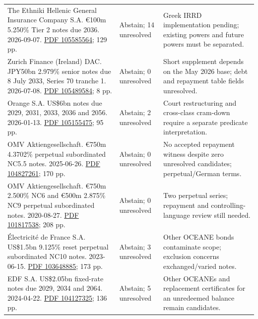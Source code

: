 \documentclass[12pt,a4paper,oneside,openany]{book}
\begin{document}
{\begin{longtable}{P{0.44\textwidth}P{0.12\textwidth}P{0.34\textwidth}}
The Ethniki Hellenic General Insurance Company S.A. €100m 5.250\% Tier 2 notes due 2036. 2026-09-07. \href{../prospectus/difficulty-2026-10-04/pdfs/case-105585564.pdf}{PDF 105585564}; 129 pp. & Abstain; 14 unresolved & Greek IRRD implementation pending; existing powers and future powers must be separated. \\

Zurich Finance (Ireland) DAC. JPY50bn 2.979\% senior notes due 8 July 2033, Series 70 tranche 1. 2026-07-08. \href{../prospectus/difficulty-2026-10-04/pdfs/case-105489584.pdf}{PDF 105489584}; 8 pp. & Abstain; 0 unresolved & Short supplement depends on the May 2026 base; debt and repayment table fields unresolved. \\

Orange S.A. US\$6bn notes due 2029, 2031, 2033, 2036 and 2056. 2026-01-13. \href{../prospectus/difficulty-2026-10-04/pdfs/case-105155475.pdf}{PDF 105155475}; 95 pp. & Abstain; 2 unresolved & Court restructuring and cross-class cram-down require a separate predicate interpretation. \\

OMV Aktiengesellschaft. €750m 4.3702\% perpetual subordinated NC5.5 notes. 2025-06-26. \href{../prospectus/difficulty-2026-10-04/pdfs/case-104827261.pdf}{PDF 104827261}; 170 pp. & Abstain; 0 unresolved & No accepted repayment witness despite zero unresolved candidates; perpetual/German terms. \\

OMV Aktiengesellschaft. €750m 2.500\% NC6 and €500m 2.875\% NC9 perpetual subordinated notes. 2020-08-27. \href{../prospectus/difficulty-2026-10-04/pdfs/case-101817538.pdf}{PDF 101817538}; 208 pp. & Abstain; 0 unresolved & Two perpetual series; repayment and controlling-language review still needed. \\

Électricité de France S.A. US\$1.5bn 9.125\% reset perpetual subordinated NC10 notes. 2023-06-15. \href{../prospectus/difficulty-2026-10-04/pdfs/case-103648885.pdf}{PDF 103648885}; 173 pp. & Abstain; 3 unresolved & Other OCEANE bonds contaminate scope; exclusion concerns exchanged/varied notes. \\

EDF S.A. US\$2.05bn fixed-rate notes due 2029, 2034 and 2064. 2024-04-22. \href{../prospectus/difficulty-2026-10-04/pdfs/case-104127325.pdf}{PDF 104127325}; 136 pp. & Abstain; 5 unresolved & Other OCEANEs and replacement certificates for an unredeemed balance remain candidates. \\


\end{longtable}}
\end{document}
